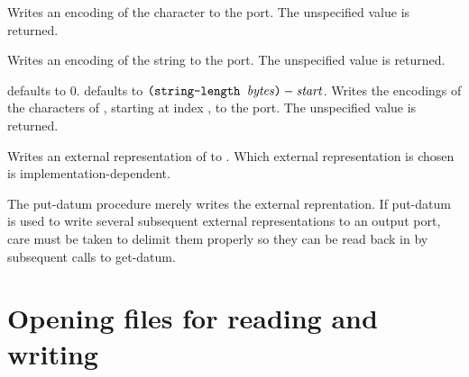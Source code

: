 \begin{entry}{%
}
   
Writes an encoding of the character  to the port. The
unspecified value is returned.
\end{entry}

\begin{entry}{%
}
   
Writes an encoding of the string to the port. The unspecified value is
returned.
\end{entry}   

\begin{entry}{%
}
   
   defaults to 0.   defaults to
$\texttt{(string-length \var{bytes})} - \var{start}$. Writes the
encodings of the  characters of , starting at
index , to the port. The unspecified value is returned.
\end{entry}


\begin{entry}{%
}

Writes an external representation of  to .
Which external representation is chosen is implementation-dependent.

\begin{note}
  The {\cf put-datum} procedure merely writes the external
  reprentation.  If {\cf put-datum} is used to write several
  subsequent external representations to an output port, care must be
  taken to delimit them properly so they can be read back in by
  subsequent calls to {\cf get-datum}.
\end{note}
\end{entry}

\section{Opening files for reading and writing}

